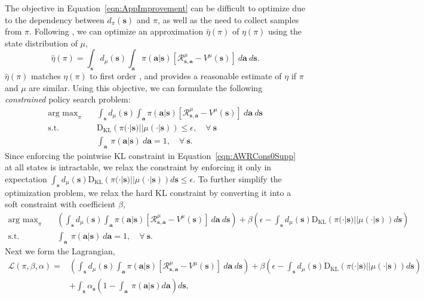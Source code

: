 \documentclass{article} \usepackage{iclr2020_conference,times}
\def\rva{{\mathbf{a}}}
\def\rvs{{\mathbf{s}}}
\begin{document}
The objective in Equation~\ref{eqn:AppImprovement} can be difficult to optimize due to the dependency between $d_\pi(\rvs)$ and $\pi$, as well as the need to collect samples from $\pi$. Following \citet{TRPOschulman15}, we can optimize an approximation $\hat{\eta}(\pi)$ of $\eta(\pi)$ using the state distribution of $\mu$,
\begin{equation}
    \hat{\eta}(\pi) = \int_\rvs d_\mu(\rvs) \int_\rva \pi(\rva | \rvs) \left[\mathcal{R}_{\rvs,\rva}^\mu - V^\mu(\rvs)\right] \ d\rva \ d\rvs .
\end{equation}
$\hat{\eta}(\pi)$ matches $\eta(\pi)$ to first order \citep{Kakade2002}, and provides a reasonable estimate of $\eta$ if $\pi$ and $\mu$ are similar.
Using this objective, we can formulate the following \emph{constrained} policy search problem:
\begin{align}
    \mathop{\mathrm{arg \ max}}_{\pi} \quad & \int_\rvs d_\mu(\rvs) \int_\rva \pi(\rva | \rvs) \left[\mathcal{R}_{\rvs,\rva}^\mu - V^\mu(\rvs)\right] \ d\rva \ d\rvs \\
    \textrm{s.t.} \quad & \mathrm{D_{KL}} \left( \pi(\cdot |\rvs) || \mu(\cdot |\rvs) \right) \leq \epsilon, \quad \forall \ \rvs \label{eqn:AWRCons0Supp}\\
    & \int_\rva \ \pi(\rva | \rvs) \ d\rva = 1, \quad \forall \ \rvs \label{eqn:AWRCons1Supp}.
\end{align}
Since enforcing the pointwise KL constraint in Equation~\ref{eqn:AWRCons0Supp} at all states is intractable, we relax the constraint by enforcing it only in expectation $\int_{\rvs} d_\mu(\rvs) \mathrm{D_{KL}} \left( \pi(\cdot |\rvs) || \mu(\cdot |\rvs) \right) d\rvs \leq \epsilon$. To further simplify the optimization problem, we relax the hard KL constraint by converting it into a soft constraint with coefficient $\beta$,
\begin{equation}
\begin{aligned}
    \mathop{\mathrm{arg \ max}}_{\pi} \quad & \left( \int_\rvs d_\mu(\rvs) \int_\rva \pi(\rva | \rvs) \left[\mathcal{R}_{\rvs,\rva}^\mu - V^\mu(\rvs)\right] \ d\rva \ d\rvs  \right) + \beta \left(\epsilon - \int_{\rvs} d_\mu(\rvs) \mathrm{D_{KL}} \left(\pi(\cdot |\rvs) || \mu(\cdot |\rvs) \right) d\rvs \right) \\
    \textrm{s.t.} \quad & \int_\rva \ \pi(\rva | \rvs) \ d\rva = 1, \quad \forall \ \rvs.
\end{aligned}
\end{equation}
Next we form the Lagrangian,
\begin{equation}
\begin{aligned}
    \mathcal{L}(\pi, \beta, \alpha) = & \left( \int_\rvs d_\mu(\rvs) \int_\rva \pi(\rva | \rvs) \left[\mathcal{R}_{\rvs,\rva}^\mu - V^\mu(\rvs)\right] \ d\rva \ d\rvs  \right) + \beta \left(\epsilon - \int_{\rvs} d_\mu(\rvs) \mathrm{D_{KL}} \left(\pi(\cdot |\rvs) || \mu(\cdot |\rvs) \right) d\rvs \right)\\
    & + \int_{\rvs} \alpha_\rvs \left(1 - \int_\rva \ \pi(\rva | \rvs) d\rva \right) d\rvs,
\end{aligned}
\end{equation}
\end{document}
